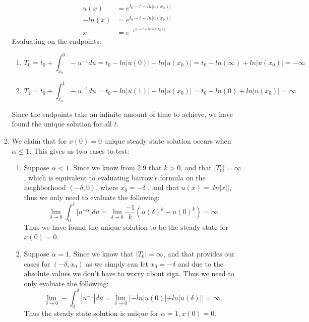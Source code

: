 \documentclass[12pt, letterpaper]{article}
\begin{document}
\begin{enumerate}
\begin{enumerate}
\begin{align*}
				u(x) &= e^{t_0 -t + ln|u(x_0)|}\\
				-ln(x) &= e^{t_0 -t + ln|u(x_0)|}\\
				x &= e^{-e^{t_0 -t + ln|u(x_0)|}}				
			\end{align*}
			Evaluating on the endpoints:
			\begin{enumerate}
				\item $$T_0 = t_0 + \int_{x_0}^0 -u^{-1}du = t_0 - ln|u(0)| + ln|u(x_0)| = t_0 - ln(\infty) + ln|u(x_0)| = -\infty$$
				\item $$T_1 = t_0 + \int_{x_0}^1 -u^{-1}du = t_0 - ln|u(1)| + ln|u(x_0)| = t_0 - ln(0) + ln|u(x_0)|= \infty$$
			\end{enumerate}
			Since the endpoints take an infinite amount of time to achieve, we have found the unique solution for all $t$.
			\iffalse
			However, if $\alpha > 1$, by the equation we got via barrows formula, then $1-\alpha = k < 1$.  Since $k$ is negative, then $u(0)^k = (-ln(0))^k = \infty^k = 0$, therefore: 
			\begin{equation*}
				t_0 + -\int_{x_0}^0 u^{-\alpha} = t_0 + \frac{-1}{k}(u(0)^{k}-u(x_0)^{k}) = t_0 + \frac{u(x_0)^{k}}{k} < \infty
			\end{equation*}
			On the other hand										
			\fi
			\item We claim that for $x(0) = 0$ unique steady state solution occurs when $\alpha \leq 1$.  This gives us two cases to test:
			\begin{enumerate}
				\item Suppose $\alpha < 1$.  Since we know from 2.9 that $k>0$, and that $|T_0| = \infty$, which is equivalent to evaluating barrow's formula on the neighborhood $(-\delta,0)$, where $x_0 = -\delta$ , and that $u(x) = |ln|x||$, thus we only need to evaluate the following:
				$$
					\lim_{\delta \to 0} \int_{0}^\delta |u^{-\alpha}| du = \lim_{\delta \to 0} \frac{-1}{k}(u(\delta)^k - u(0)^k) = \infty				
				$$ 
				Thus we have found the unique solution to be the steady state for $x(0) = 0$.
				\item Suppose $\alpha = 1$.  Since we know that $|T_0| = \infty$, and that provides our cases for $(-\delta, x_0)$ as we simply can let $x_0 = -\delta$ and due to the absolute values we don't have to worry about sign.  Thus we need to only evaluate the following:
				$$
					\lim_{\delta \to 0} -\int_{0}^\delta |u^{-1}| du = \lim_{\delta \to 0} |-ln|u(0)| + ln|u(\delta)|| = \infty.
				$$
				Thus the steady state solution is unique for $\alpha = 1, x(0) = 0$.
				

\end{enumerate}
\end{enumerate}
\end{enumerate}
\end{document}
